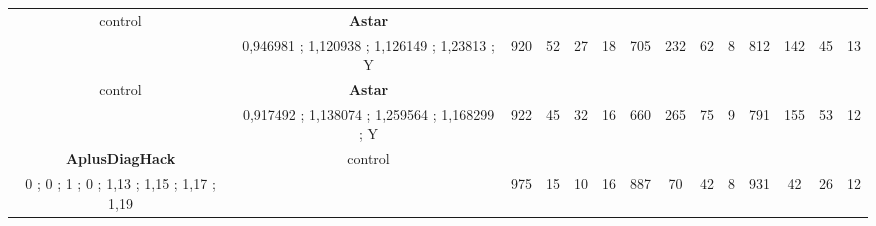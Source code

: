 \begin{table}[]
{\begin{tabular}{|c|c|c|c|c|c|c|c|c|c|c|c|c|c|}
control & \cellcolor{blue!15}\textbf{Astar}& {\color[HTML]{00009B} } & {\color[HTML]{9A0000} } & {\color[HTML]{009901} } &  & {\color[HTML]{00009B} } & {\color[HTML]{9A0000} } & {\color[HTML]{009901} } &  & {\color[HTML]{00009B} } & {\color[HTML]{9A0000} } & {\color[HTML]{009901} } &  \\ 
 & \cellcolor{ blue!15}0,946981 ; 1,120938 ; 1,126149 ; 1,23813 ; Y & \multirow{-2}{*}{{\color[HTML]{00009B} 920}} & \multirow{-2}{*}{{\color[HTML]{9A0000} 52}} & \multirow{-2}{*}{{\color[HTML]{009901} 27}} & \multirow{-2}{*}{18} & \multirow{-2}{*}{{\color[HTML]{00009B} 705}} & \multirow{-2}{*}{{\color[HTML]{9A0000} 232}} & \multirow{-2}{*}{{\color[HTML]{009901} 62}} & \multirow{-2}{*}{8} & \multirow{-2}{*}{{\color[HTML]{00009B} 812}} & \multirow{-2}{*}{{\color[HTML]{9A0000} 142}} & \multirow{-2}{*}{{\color[HTML]{009901} 45}} & \multirow{-2}{*}{13} \\ \hline

control & \cellcolor{blue!15}\textbf{Astar}& {\color[HTML]{00009B} } & {\color[HTML]{9A0000} } & {\color[HTML]{009901} } &  & {\color[HTML]{00009B} } & {\color[HTML]{9A0000} } & {\color[HTML]{009901} } &  & {\color[HTML]{00009B} } & {\color[HTML]{9A0000} } & {\color[HTML]{009901} } &  \\ 
 & \cellcolor{ blue!15}0,917492 ; 1,138074 ; 1,259564 ; 1,168299 ; Y & \multirow{-2}{*}{{\color[HTML]{00009B} 922}} & \multirow{-2}{*}{{\color[HTML]{9A0000} 45}} & \multirow{-2}{*}{{\color[HTML]{009901} 32}} & \multirow{-2}{*}{16} & \multirow{-2}{*}{{\color[HTML]{00009B} 660}} & \multirow{-2}{*}{{\color[HTML]{9A0000} 265}} & \multirow{-2}{*}{{\color[HTML]{009901} 75}} & \multirow{-2}{*}{9} & \multirow{-2}{*}{{\color[HTML]{00009B} 791}} & \multirow{-2}{*}{{\color[HTML]{9A0000} 155}} & \multirow{-2}{*}{{\color[HTML]{009901} 53}} & \multirow{-2}{*}{12} \\ \hline


\cellcolor{blue!15}\textbf{AplusDiagHack} & control& {\color[HTML]{00009B} } & {\color[HTML]{9A0000} } & {\color[HTML]{009901} } &  & {\color[HTML]{00009B} } & {\color[HTML]{9A0000} } & {\color[HTML]{009901} } &  & {\color[HTML]{00009B} } & {\color[HTML]{9A0000} } & {\color[HTML]{009901} } &  \\ 
\cellcolor{ blue!15}0 ; 0 ; 1 ; 0 ; 1,13 ; 1,15 ; 1,17 ; 1,19 &  & \multirow{-2}{*}{{\color[HTML]{00009B} 975}} & \multirow{-2}{*}{{\color[HTML]{9A0000} 15}} & \multirow{-2}{*}{{\color[HTML]{009901} 10}} & \multirow{-2}{*}{16} & \multirow{-2}{*}{{\color[HTML]{00009B} 887}} & \multirow{-2}{*}{{\color[HTML]{9A0000} 70}} & \multirow{-2}{*}{{\color[HTML]{009901} 42}} & \multirow{-2}{*}{8} & \multirow{-2}{*}{{\color[HTML]{00009B} 931}} & \multirow{-2}{*}{{\color[HTML]{9A0000} 42}} & \multirow{-2}{*}{{\color[HTML]{009901} 26}} & \multirow{-2}{*}{12} \\ \hline


\end{tabular}}
\end{table}
